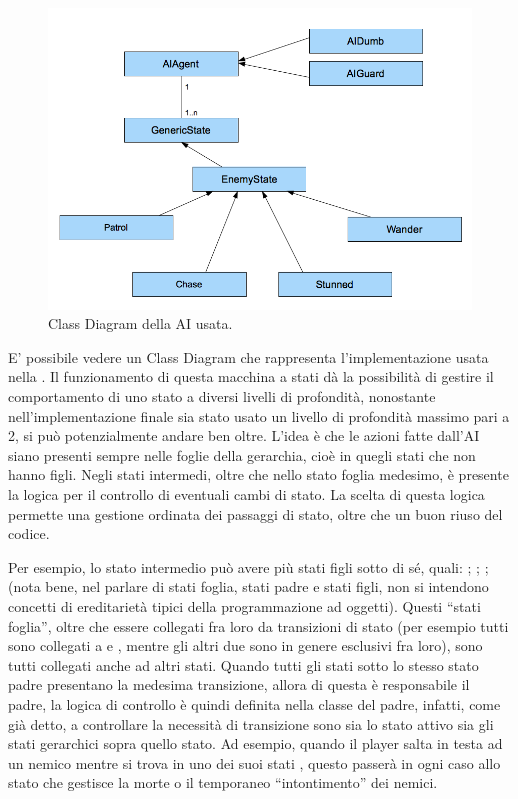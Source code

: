 \begin{figure}[h]
\centerline{\includegraphics[scale=0.45]{images/development/classdiagramAI.png}}
\caption{Class Diagram della AI usata.}
\label{fig:classdiagramAI}
\end{figure}

E' possibile vedere un Class Diagram che rappresenta l'implementazione usata nella \myfig{\ref{fig:classdiagramAI}}.
Il funzionamento di questa macchina a stati dà la possibilità di gestire il comportamento di uno stato a diversi livelli di profondità, nonostante nell'implementazione finale sia stato usato un livello di profondità massimo pari a 2, si può potenzialmente andare ben oltre.
L'idea è che le azioni fatte dall'AI siano presenti sempre nelle foglie della gerarchia, cioè in quegli stati che non hanno figli. Negli stati intermedi, oltre che nello stato foglia medesimo, è presente la logica per il controllo di eventuali cambi di stato.
La scelta di questa logica permette una gestione ordinata dei passaggi di stato, oltre che un buon riuso del codice. 

Per esempio, lo stato intermedio  può avere più stati figli sotto di sé, quali: ; ; ;  (nota bene, nel parlare di stati foglia, stati padre e stati figli, non si intendono concetti di ereditarietà tipici della programmazione ad oggetti). Questi ``stati foglia'', oltre che essere collegati fra loro da transizioni di stato (per esempio tutti sono collegati a  e , mentre gli altri due sono in genere esclusivi fra loro), sono tutti collegati anche ad altri stati. Quando tutti gli stati sotto lo stesso stato padre presentano la medesima transizione, allora di questa è responsabile il padre, la logica di controllo è quindi definita nella classe del padre, infatti, come già detto, a controllare la necessità di transizione sono sia lo stato attivo sia gli stati gerarchici sopra quello stato. Ad esempio, quando il player salta in testa ad un nemico mentre si trova in uno dei suoi stati , questo passerà in ogni caso allo stato  che gestisce la morte o il temporaneo ``intontimento'' dei nemici.

